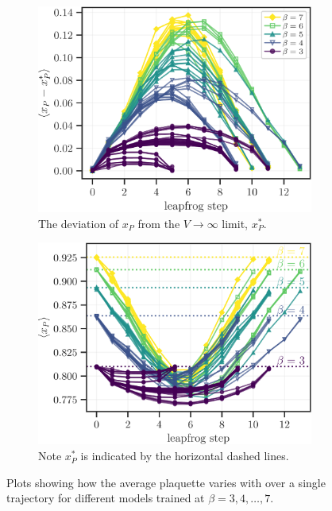 \documentclass[a4paper,11pt]{article}
\begin{document}
\begin{figure}[htpb]
    \begin{subfigure}[b]{0.45\textwidth}
        \includegraphics[width=\linewidth]{assets/dplaqsf_vs_lf.pdf}
        \caption{\label{subfig:dplaqsf}The deviation of \(x_{P}\) from the
        \(V\rightarrow\infty\) limit, \(x_{P}^{\ast}\).}
    \end{subfigure}
    \hfill
    \begin{subfigure}[b]{0.45\textwidth}
        \includegraphics[width=\linewidth]{assets/plaqsf_vs_lf.pdf}
        \caption{\label{subfig:plaqsf}Note \(x^{\ast}_{P}\) is indicated by the
        horizontal dashed lines.}
    \end{subfigure}
    \caption{\label{fig:plaqsf}Plots showing how the average plaquette varies
        with over a single trajectory for different models trained at \(\beta =
    3, 4, \ldots, 7\).}
\end{figure}
%
\end{document}
